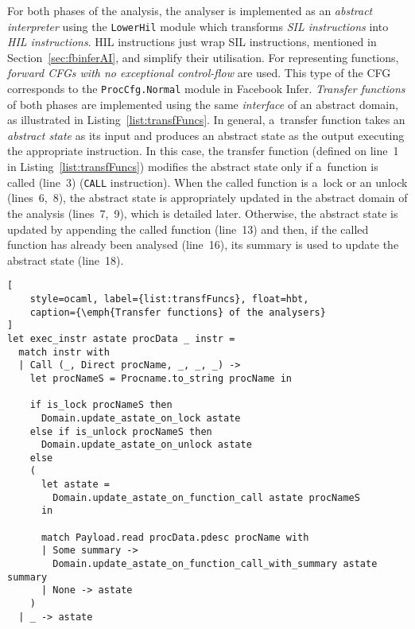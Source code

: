For both phases of the analysis, the analyser is implemented as an
\emph{abstract interpreter} using the \texttt{LowerHil} module which
transforms \emph{SIL instructions} into \emph{HIL instructions}.
HIL instructions just wrap SIL instructions, mentioned in
Section~\ref{sec:fbinferAI}, and simplify their utilisation. For
representing functions, \emph{forward CFGs with no exceptional
control-flow} are used. This type of the CFG corresponds to the
\texttt{ProcCfg.Normal} module in Facebook Infer. \emph{Transfer
functions} of both phases are implemented using the same \emph{interface}
of an abstract domain, as illustrated in Listing~\ref{list:transfFuncs}.
In general, a~transfer function takes an \emph{abstract state} as its
input and produces an abstract state as the output executing the
appropriate instruction. In this case, the transfer function (defined on
line~1 in Listing~\ref{list:transfFuncs}) modifies the abstract state only
if a~function is called (line~3) (\texttt{CALL} instruction). When the
called function is a~lock or an unlock (lines~6,~8), the abstract state is
appropriately updated in the abstract domain of the analysis (lines~7,~9),
which is detailed later. Otherwise, the abstract state is updated
by appending the called function (line~13) and then, if the called function
has already been analysed (line~16), its summary is used to update the
abstract state (line~18).

\begin{lstlisting}[
    style=ocaml, label={list:transfFuncs}, float=hbt,
    caption={\emph{Transfer functions} of the analysers}
]
let exec_instr astate procData _ instr =
  match instr with
  | Call (_, Direct procName, _, _, _) ->
    let procNameS = Procname.to_string procName in

    if is_lock procNameS then
      Domain.update_astate_on_lock astate
    else if is_unlock procNameS then
      Domain.update_astate_on_unlock astate
    else
    (
      let astate =
        Domain.update_astate_on_function_call astate procNameS
      in

      match Payload.read procData.pdesc procName with
      | Some summary ->
        Domain.update_astate_on_function_call_with_summary astate summary
      | None -> astate
    )
  | _ -> astate
\end{lstlisting}

